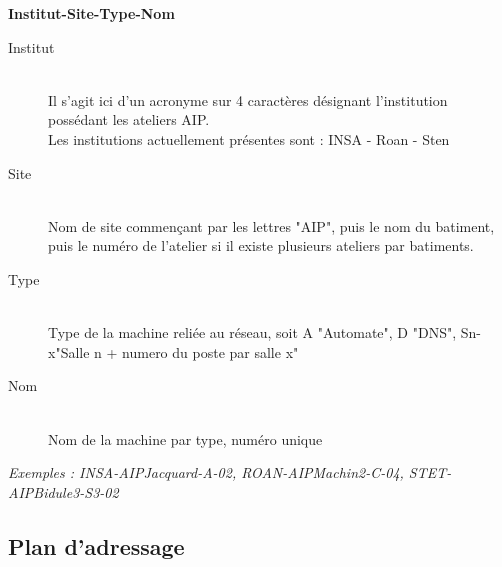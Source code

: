 \documentclass[a4paper]{article}
\begin{document}
	\textbf{Institut-Site-Type-Nom}	
	
	\begin{description}
	\item[Institut]\hfill\\
	Il s'agit ici d'un acronyme sur 4 caractères désignant l'institution possédant les ateliers AIP.\\
	Les institutions actuellement présentes sont :  INSA - Roan - Sten
	
	\item[Site]\hfill\\
	Nom de site commençant par les lettres "AIP", puis le nom du batiment, puis le numéro de l'atelier si il existe plusieurs ateliers par batiments.
	
	\item[Type]\hfill\\
	Type de la machine reliée au réseau, soit A "Automate", D "DNS", Sn-x"Salle n + numero du poste par salle x"	
	
	\item[Nom]\hfill\\
	Nom de la machine par type, numéro unique	
	\end{description}	
	
	\textit{Exemples : INSA-AIPJacquard-A-02, ROAN-AIPMachin2-C-04, STET-AIPBidule3-S3-02}	
	

	\subsection{Plan d'adressage}

	
\end{document}
